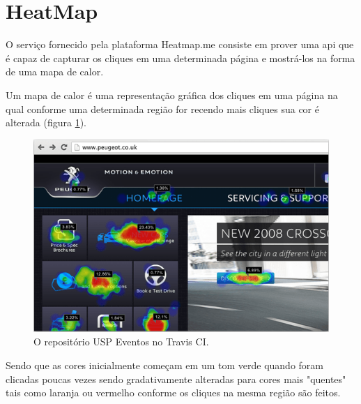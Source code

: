 \section{HeatMap}
\par O serviço fornecido pela plataforma Heatmap.me consiste em prover uma api que é capaz de capturar os cliques em uma determinada página e mostrá-los na forma de uma mapa de calor.
\par Um mapa de calor é uma representação gráfica dos cliques em uma página na qual conforme uma determinada região for recendo mais cliques sua cor é alterada (figura \ref{fig:heatmap_explanation}).
\begin{figure}[htb]
\centering
\includegraphics[width=15cm]{figuras/heatmap_explanation}
\caption{\label{fig:heatmap_explanation} O repositório USP Eventos no Travis CI.}
\end{figure}
\par Sendo que as cores inicialmente começam em um tom verde quando foram clicadas poucas vezes sendo gradativamente alteradas para cores mais "quentes" tais como laranja ou vermelho conforme os cliques na mesma região são feitos.